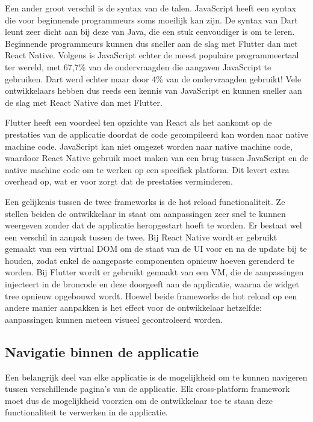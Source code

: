 Een ander groot verschil is de syntax van de talen. JavaScript heeft een syntax
die voor beginnende programmeurs soms moeilijk kan zijn. De syntax van Dart
leunt zeer dicht aan bij deze van Java, die een stuk eenvoudiger is om te leren.
Beginnende programmeurs kunnen dus sneller aan de slag met Flutter dan met React
Native. Volgens \textcite{Liu2020a} is JavaScript echter de meest populaire
programmeertaal ter wereld, met 67,7\% van de ondervraagden die aangaven
JavaScript te gebruiken. Dart werd echter maar door 4\% van de ondervraagden
gebruikt! Vele ontwikkelaars hebben dus reeds een kennis van JavaScript en
kunnen sneller aan de slag met React Native dan met Flutter.

Flutter heeft een voordeel ten opzichte van React als het aankomt op de
prestaties  van de applicatie doordat de code gecompileerd kan worden naar
native machine code. JavaScript kan niet omgezet worden naar native machine
code, waardoor React Native gebruik moet maken van een brug tussen JavaScript en
de native machine code om te werken op een specifiek platform. Dit levert extra
overhead op, wat er voor zorgt dat de prestaties verminderen. 

Een gelijkenis tussen de twee frameworks is de hot reload functionaliteit. Ze
stellen beiden de ontwikkelaar in staat om aanpassingen zeer snel te kunnen
weergeven zonder dat de applicatie heropgestart hoeft te worden. Er bestaat wel
een verschil in aanpak tussen de twee. Bij React Native wordt er gebruikt
gemaakt van een virtual DOM om de staat van de UI voor en na de update bij te
houden, zodat enkel de aangepaste componenten opnieuw hoeven gerenderd te
worden. Bij Flutter wordt er gebruikt gemaakt van een VM, die de aanpassingen
injecteert in de broncode en deze doorgeeft aan de applicatie, waarna de widget
tree opnieuw opgebouwd wordt. Hoewel beide frameworks de hot reload op een
andere manier aanpakken is het effect voor de ontwikkelaar hetzelfde:
aanpassingen kunnen meteen visueel gecontroleerd worden.


\subsection{Navigatie binnen de applicatie}
\label{subsec:navigatieApplicatie}

Een belangrijk deel van elke applicatie is de mogelijkheid om te kunnen
navigeren tussen verschillende pagina's van de applicatie. Elk cross-platform
framework moet dus de mogelijkheid voorzien om de ontwikkelaar toe te staan deze
functionaliteit te verwerken in de applicatie.

